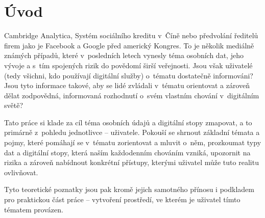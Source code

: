 \chapter*{Úvod}
\pagestyle{plain}

Cambridge Analytica, Systém sociálního kreditu v~Číně nebo předvolání ředitelů firem jako je Facebook a Google před americký Kongres. To je několik mediálně známých případů, které v~posledních letech vynesly téma osobních dat, jeho vývoje a s~tím spojených rizik do povědomí širší veřejnosti.
Jsou však uživatelé (tedy všichni, kdo používají digitální služby) o~tématu dostatečně informováni? Jsou tyto informace takové, aby se lidé zvládali v~tématu orientovat a zároveň dělat zodpovědná, informovaná rozhodnutí o~svém vlastním chování v~digitálním světě?

Tato práce si klade za cíl téma osobních údajů a digitální stopy zmapovat, a to primárně z~pohledu jednotlivce -- uživatele. Pokouší se shrnout základní témata a pojmy, které pomáhají se v~tématu zorientovat a mluvit o~něm, prozkoumat typy dat a digitální stopy, která naším každodenním chováním vzniká, upozornit na rizika a zároveň nabídnout konkrétní přístupy, kterými uživatel může tuto realitu ovlivňovat.

Tyto teoretické poznatky jsou pak kromě jejich samotného přínosu i podkladem pro praktickou část práce -- vytvoření prostředí, ve kterém je uživatel tímto tématem provázen.
